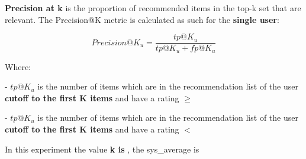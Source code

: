 \documentclass[12pt, a4paper]{article}
\begin{document}



\hfill\break
\textbf{Precision at k} is the proportion of recommended items in the top-k set that are relevant.
 The Precision@K metric is calculated as such for the \textbf{single user}:

    \[
    Precision@K_u = \frac{tp@K_u}{tp@K_u + fp@K_u}
    \]

    Where:

    - $tp@K_u$ is the number of items which are in the recommendation list  of the user
      \textbf{cutoff to the first K items} and have a rating $\geq$


    - $tp@K_u$ is the number of items which are in the recommendation list  of the user
      \textbf{cutoff to the first K items} and have a rating $<$



In this experiment the value \textbf{k is },
the sys\_average is \textbf{}


\end{document}
